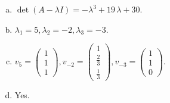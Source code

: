 \begin{questions}
\begin{solution}
\begin{enumerate}[(a)]
\item $\det(A-\lambda I)=-{\lambda}^{3} + 19 \, {\lambda} + 30$.
\item ${\lambda}_1=5, {\lambda}_2=-2, {\lambda}_3=-3$.
\item $v_{5}=\left(\begin{array}{r}
1 \\
1 \\
1
\end{array}\right), v_{-2}=\left(\begin{array}{r}
1 \\
\frac{2}{3} \\
\frac{1}{3}
\end{array}\right), v_{-3}=\left(\begin{array}{r}
1 \\
1 \\
0
\end{array}\right)$.
\item Yes.
\end{enumerate}
\end{solution}

\end{questions}

\newpage


\begin{center}
\end{center}

